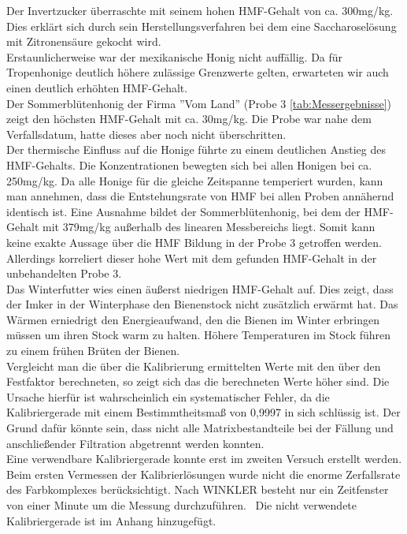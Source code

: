 Der Invertzucker überraschte mit seinem hohen HMF-Gehalt von ca. 300mg/kg. Dies erklärt sich durch sein Herstellungsverfahren bei dem eine Saccharoselösung mit Zitronensäure gekocht wird.\\
Erstaunlicherweise war der mexikanische Honig nicht auffällig. Da für Tropenhonige deutlich höhere zulässige Grenzwerte gelten, erwarteten wir auch einen deutlich erhöhten HMF-Gehalt. \\
Der Sommerblütenhonig der Firma ''Vom Land'' (Probe 3 \ref{tab:Messergebnisse}) zeigt den höchsten HMF-Gehalt mit ca. 30mg/kg. Die Probe war nahe dem Verfallsdatum, hatte dieses aber noch nicht überschritten.\\
Der thermische Einfluss auf die Honige führte zu einem deutlichen Anstieg des HMF-Gehalts. Die Konzentrationen bewegten sich bei allen Honigen bei ca. 250mg/kg. Da alle Honige für die gleiche Zeitspanne temperiert wurden, kann man annehmen, dass die Entstehungsrate von HMF bei allen Proben annähernd identisch ist. Eine Ausnahme bildet der Sommerblütenhonig, bei dem der HMF-Gehalt mit 379mg/kg außerhalb des linearen Messbereichs liegt. Somit kann keine exakte Aussage über die HMF Bildung in der Probe 3 getroffen werden. Allerdings korreliert dieser hohe Wert mit dem gefunden HMF-Gehalt in der unbehandelten Probe 3.\\
Das Winterfutter wies einen äußerst niedrigen HMF-Gehalt auf. Dies zeigt, dass der Imker in der Winterphase den Bienenstock nicht zusätzlich erwärmt hat. Das Wärmen erniedrigt den Energieaufwand, den die Bienen im Winter erbringen müssen um ihren Stock warm zu halten. Höhere Temperaturen im Stock führen zu einem frühen Brüten der Bienen.\\
Vergleicht man die über die Kalibrierung ermittelten Werte mit den über den Festfaktor berechneten, so zeigt sich das die berechneten Werte höher sind. Die Ursache hierfür ist wahrscheinlich ein systematischer Fehler, da die Kalibriergerade mit einem Bestimmtheitsmaß von 0,9997 in sich schlüssig ist. Der Grund dafür könnte sein, dass nicht alle Matrixbestandteile bei der Fällung und anschließender Filtration abgetrennt werden konnten.\\
Eine verwendbare Kalibriergerade konnte erst im zweiten Versuch erstellt werden. Beim ersten Vermessen der Kalibrierlösungen wurde nicht die enorme Zerfallsrate des Farbkomplexes berücksichtigt. Nach WINKLER besteht nur ein Zeitfenster von einer Minute um die Messung durchzuführen.~\cite{Winkler} Die nicht verwendete Kalibriergerade ist im Anhang hinzugefügt.\\
